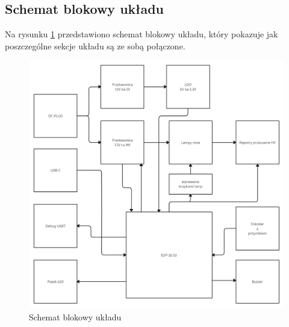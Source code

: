 \documentclass[../main.tex]{subfiles}
\begin{document}
\subsection{Schemat blokowy układu}
Na rysunku \ref{fig:schemat_blokowy} przedstawiono schemat blokowy układu, który pokazuje jak poszczególne sekcje układu są ze sobą połączone.

\begin{figure}[H]
    \centering
    \includegraphics[width=1\textwidth]{schemat_blokowy.jpg}
    \caption{Schemat blokowy układu}
    \label{fig:schemat_blokowy}
\end{figure}

\end{document}
